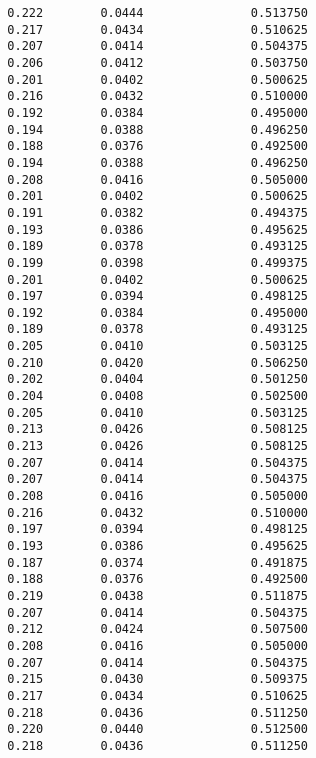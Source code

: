 \documentclass[
  letterpaper,
  DIV=11,
  numbers=noendperiod]{scrartcl}
\begin{document}
\begin{verbatim}
  0.222        0.0444               0.513750              
  0.217        0.0434               0.510625              
  0.207        0.0414               0.504375              
  0.206        0.0412               0.503750              
  0.201        0.0402               0.500625              
  0.216        0.0432               0.510000              
  0.192        0.0384               0.495000              
  0.194        0.0388               0.496250              
  0.188        0.0376               0.492500              
  0.194        0.0388               0.496250              
  0.208        0.0416               0.505000              
  0.201        0.0402               0.500625              
  0.191        0.0382               0.494375              
  0.193        0.0386               0.495625              
  0.189        0.0378               0.493125              
  0.199        0.0398               0.499375              
  0.201        0.0402               0.500625              
  0.197        0.0394               0.498125              
  0.192        0.0384               0.495000              
  0.189        0.0378               0.493125              
  0.205        0.0410               0.503125              
  0.210        0.0420               0.506250              
  0.202        0.0404               0.501250              
  0.204        0.0408               0.502500              
  0.205        0.0410               0.503125              
  0.213        0.0426               0.508125              
  0.213        0.0426               0.508125              
  0.207        0.0414               0.504375              
  0.207        0.0414               0.504375              
  0.208        0.0416               0.505000              
  0.216        0.0432               0.510000              
  0.197        0.0394               0.498125              
  0.193        0.0386               0.495625              
  0.187        0.0374               0.491875              
  0.188        0.0376               0.492500              
  0.219        0.0438               0.511875              
  0.207        0.0414               0.504375              
  0.212        0.0424               0.507500              
  0.208        0.0416               0.505000              
  0.207        0.0414               0.504375              
  0.215        0.0430               0.509375              
  0.217        0.0434               0.510625              
  0.218        0.0436               0.511250              
  0.220        0.0440               0.512500              
  0.218        0.0436               0.511250              

\end{verbatim}
\end{document}
